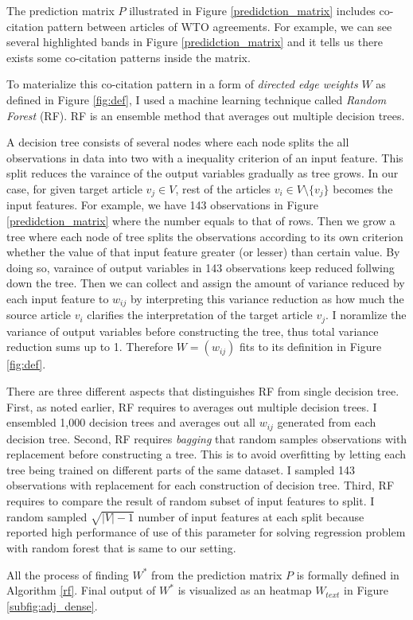 The prediction matrix $P$ illustrated in Figure \ref{predidction_matrix}
includes co-citation pattern between articles of WTO agreements. For example,
we can see several highlighted bands in Figure \ref{predidction_matrix}
and it tells us there exists some co-citation patterns inside the matrix.

To materialize this co-citation pattern in a form of \textit{directed edge weights} $W$ as defined in Figure \ref{fig:def},
I used a machine learning technique called \textit{Random Forest} (RF). RF is an ensemble method that averages out
multiple decision trees.

A decision tree consists of several nodes where each node splits the all observations in data into two with a inequality criterion of an input feature.
This split reduces the varaince of the output variables gradually as tree grows.
In our case, for given target article $v_j \in V$, rest of the articles $v_i \in V \setminus \{v_j\}$ becomes the input features.
For example, we have 143 observations in Figure \ref{predidction_matrix} where the number equals to that of rows.
Then we grow a tree where each node of tree splits
the observations according to its own criterion
whether the value of that input feature greater (or lesser) than certain value.
By doing so,
varaince of output variables in 143 observations keep reduced follwing down the tree.
Then we can collect and assign the amount of variance reduced by each input feature to $w_{ij}$
by interpreting this variance reduction as how much
the source article $v_i$ clarifies the interpretation of the target article $v_j$.
I noramlize the variance of output variables before constructing the tree, thus total variance reduction
sums up to 1. Therefore $W = (w_{ij})$ fits to its definition in Figure \ref{fig:def}.

There are three different aspects that distinguishes RF from single decision tree.
First, as noted earlier, RF requires to averages out multiple decision trees.
I ensembled 1,000 decision trees and averages out all $w_{ij}$ generated from each decision tree.
Second, RF requires \textit{bagging} that random samples observations with replacement before constructing a tree.
This is to avoid overfitting by letting each tree being trained on different parts of the same dataset. 
I sampled 143 observations with replacement for each construction of decision tree. 
Third, RF requires to compare the result of random subset of input features to split.
I random sampled $\sqrt{|V|-1}$ number of input features at each split because \cite{genie3} reported high performance of use of this parameter for solving regression problem with random forest that is same to our setting.

All the process of finding $W^*$ from the prediction matrix $P$ is formally defined in Algorithm \ref{rf}.
Final output of $W^*$ is visualized as an heatmap $W_{text}$ in Figure \ref{subfig:adj_dense}.



